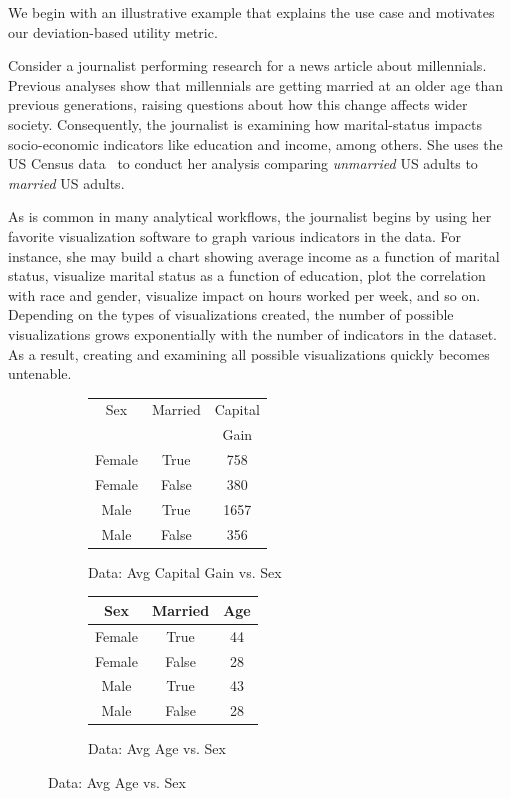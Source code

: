 We begin with an illustrative example that explains the \SeeDB use case and motivates our deviation-based
utility metric. 
\begin{example}
Consider a journalist performing research for a news article about millennials.
Previous analyses show that millennials are getting married at an older age than 
previous generations, raising questions about how this change affects
wider society.
Consequently, the journalist is examining how marital-status
impacts socio-economic indicators like education and income, among others.
She uses the US Census data~\cite{census}
to conduct her analysis comparing {\em unmarried} US adults
to {\em married} US adults.

As is common in many analytical workflows, the journalist begins by using her favorite 
visualization software to graph various indicators in the data.
For instance, she may build a chart showing average income as a function of marital status,
visualize marital status as a function of education, plot the correlation with race and gender,
visualize impact on hours worked per week, and so on.
Depending on the types of visualizations created, the number of possible 
visualizations grows exponentially with the number of indicators in the dataset.
As a result, creating and examining all possible visualizations
quickly becomes untenable.

\begin{figure}[h]
\vspace{-7pt}
	\centering
	\begin{subfigure}{0.49\linewidth}
	   \begin{tabular}{ccc} \hline
	   	Sex  &   Married & Capital \\
	   	 & & Gain  \\ \hline
		Female & True  &  758 \\ \hline
		Female & False &  380 \\ \hline
		Male   & True  &  1657 \\ \hline
		Male   & False &  356 \\ \hline
	  \end{tabular}
		  \caption{Data: Avg Capital Gain vs. Sex} \label{tab:interesting_viz}
	\end{subfigure}
	\begin{subfigure}{0.49\linewidth}
	   \begin{tabular}{ccc} \hline
	   	Sex  &   Married & Age \\ \hline
		Female & True  &  44 \\ \hline
		Female & False &  28 \\ \hline
		Male   & True  &  43 \\ \hline
		Male   & False &  28 \\ \hline
	  \end{tabular}
	  \caption{Data: Avg Age vs. Sex} \label{tab:uninteresting_viz}
	\end{subfigure}
	

\end{figure}
\end{example}
